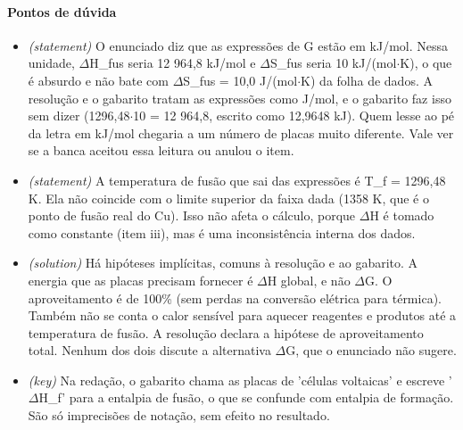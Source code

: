 \documentclass{article}%
\begin{document}
\paragraph{Pontos de dúvida}%
\begin{itemize}%
\item%
\textit{(statement)} O enunciado diz que as expressões de G estão em kJ/mol. Nessa unidade, $\Delta$H\_fus seria 12 964,8 kJ/mol e $\Delta$S\_fus seria 10 kJ/(mol$\cdot$K), o que é absurdo e não bate com $\Delta$S\_fus = 10,0 J/(mol$\cdot$K) da folha de dados. A resolução e o gabarito tratam as expressões como J/mol, e o gabarito faz isso sem dizer (1296,48$\cdot$10 = 12 964,8, escrito como 12,9648 kJ). Quem lesse ao pé da letra em kJ/mol chegaria a um número de placas muito diferente. Vale ver se a banca aceitou essa leitura ou anulou o item.%
\item%
\textit{(statement)} A temperatura de fusão que sai das expressões é T\_f = 1296,48 K. Ela não coincide com o limite superior da faixa dada (1358 K, que é o ponto de fusão real do Cu). Isso não afeta o cálculo, porque $\Delta$H é tomado como constante (item iii), mas é uma inconsistência interna dos dados.%
\item%
\textit{(solution)} Há hipóteses implícitas, comuns à resolução e ao gabarito. A energia que as placas precisam fornecer é $\Delta$H global, e não $\Delta$G. O aproveitamento é de 100\% (sem perdas na conversão elétrica para térmica). Também não se conta o calor sensível para aquecer reagentes e produtos até a temperatura de fusão. A resolução declara a hipótese de aproveitamento total. Nenhum dos dois discute a alternativa $\Delta$G, que o enunciado não sugere.%
\item%
\textit{(key)} Na redação, o gabarito chama as placas de 'células voltaicas' e escreve '$\Delta$H\_f' para a entalpia de fusão, o que se confunde com entalpia de formação. São só imprecisões de notação, sem efeito no resultado.%
\end{itemize}%
\end{document}
